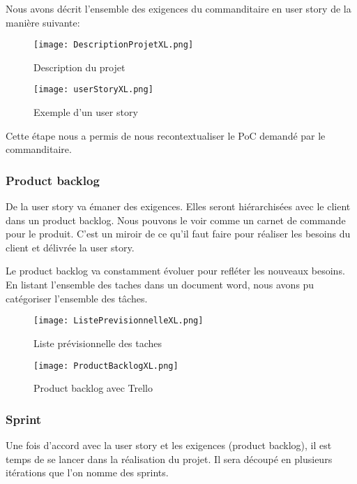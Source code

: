 Nous avons décrit l'ensemble des exigences du commanditaire en user story de la manière suivante: 
\begin{figure}[h!]
  \centering
  \texttt{[image: DescriptionProjetXL.png]}
	\caption[]{Description du projet}
	\label{}
\end{figure}

\begin{figure}[h!]
  \centering
  \texttt{[image: userStoryXL.png]}
	\caption[]{Exemple d’un user story}
	\label{}
\end{figure}

Cette étape nous a permis de nous recontextualiser le PoC demandé par le commanditaire. 


\subsubsection{Product backlog}
De la user story va émaner des exigences.
Elles seront hiérarchisées avec le client dans un product backlog.
Nous pouvons le voir comme un carnet de commande pour le produit. 
C'est un miroir de ce qu'il faut faire pour réaliser les besoins du client et délivrée la user story.  

Le product backlog va constamment évoluer pour refléter les nouveaux besoins. 
En listant l'ensemble des taches dans un document word, nous avons pu catégoriser l’ensemble des tâches.

\begin{figure}[h!]
  \centering
  \texttt{[image: ListePrevisionnelleXL.png]}
	\caption[]{Liste prévisionnelle des taches}
	\label{}
\end{figure}

\begin{figure}[h!]
  \centering
  \texttt{[image: ProductBacklogXL.png]}
	\caption[]{Product backlog avec Trello}
	\label{}
\end{figure}



\subsubsection{Sprint}
Une fois d'accord avec la user story et les exigences (product backlog), il est temps de se lancer dans la réalisation du projet.
Il sera découpé en plusieurs itérations que l'on nomme des sprints. 

